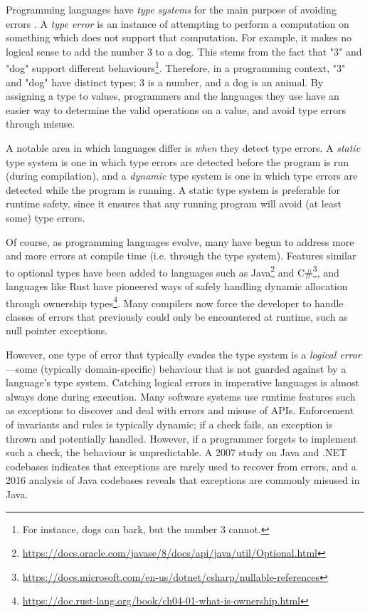 \documentclass[12pt, a4paper, bibliography=totocnumbered]{scrreprt}
\begin{document}
Programming languages have \emph{type systems} for the main purpose of avoiding errors \cite{cardellitypes}. A \emph{type error} is an instance of attempting to perform a computation on something which does not support that computation. For example, it makes no logical sense to add the number 3 to a dog. This stems from the fact that "3" and "dog" support different behaviours\footnote{For instance, dogs can bark, but the number 3 cannot.}. Therefore, in a programming context, "3" and "dog" have distinct types; 3 is a number, and a dog is an animal. By assigning a type to values, programmers and the languages they use have an easier way to determine the valid operations on a value, and avoid type errors through misuse.

A notable area in which languages differ is \emph{when} they detect type errors. A \emph{static} type system is one in which type errors are detected before the program is run (during compilation), and a \emph{dynamic} type system is one in which type errors are detected while the program is running. A static type system is preferable for runtime safety, since it ensures that any running program will avoid (at least some) type errors.

Of course, as programming languages evolve, many have begun to address more and more errors at compile time (i.e. through the type system). Features similar to optional types have been added to languages such as Java\footnote{\url{https://docs.oracle.com/javase/8/docs/api/java/util/Optional.html}} and C\#\footnote{\url{https://docs.microsoft.com/en-us/dotnet/csharp/nullable-references}}, and languages like Rust have pioneered ways of safely handling dynamic allocation through ownership types\footnote{\url{https://doc.rust-lang.org/book/ch04-01-what-is-ownership.html}}. Many compilers now force the developer to handle classes of errors that previously could only be encountered at runtime, such as null pointer exceptions.

However, one type of error that typically evades the type system is a \emph{logical error}---some (typically domain-specific) behaviour that is not guarded against by a language's type system. Catching logical errors in imperative languages is almost always done during execution. Many software systems use runtime features such as exceptions to discover and deal with errors and misuse of APIs. Enforcement of invariants and rules is typically dynamic; if a check fails, an exception is thrown and potentially handled. However, if a programmer forgets to implement such a check, the behaviour is unpredictable. A 2007 study \cite{exceptionsusedpoorly} on Java and .NET codebases indicates that exceptions are rarely used to recover from errors, and a 2016 analysis of Java codebases \cite{badjavaexceptions} reveals that exceptions are commonly misused in Java.
\end{document}
